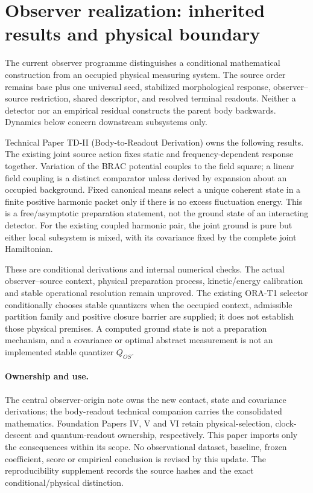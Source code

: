 \documentclass[11pt]{article}
\begin{document}
\section{Observer realization: inherited results and physical boundary}
\label{sec:observer-update-20260914}
The current observer programme distinguishes a conditional mathematical
construction from an occupied physical measuring system. The source order
remains base plus one universal seed, stabilized morphological response,
observer--source restriction, shared descriptor, and resolved terminal
readouts. Neither a detector nor an empirical residual constructs the parent
body backwards. Dynamics below concern downstream subsystems only.

Technical Paper TD-II (Body-to-Readout Derivation) owns the following
results. The existing joint source action fixes static and frequency-dependent
response together. Variation of the BRAC potential couples to the field
square; a linear field coupling is a distinct comparator unless derived by
expansion about an occupied background. Fixed canonical means select a unique
coherent state in a finite positive harmonic packet only if there is no excess
fluctuation energy. This is a free/asymptotic preparation statement, not the
ground state of an interacting detector. For the existing coupled harmonic
pair, the joint ground is pure but either local subsystem is mixed, with its
covariance fixed by the complete joint Hamiltonian.

These are conditional derivations and internal numerical checks. The actual
observer--source context, physical preparation process, kinetic/energy
calibration and stable operational resolution remain unproved. The existing
ORA-T1 selector conditionally chooses stable quantizers when the occupied
context, admissible partition family and positive closure barrier are supplied;
it does not establish those physical premises. A computed ground state is not
a preparation mechanism, and a covariance or optimal abstract measurement is
not an implemented stable quantizer $Q_{OS}$.

\paragraph{Ownership and use.}
The central observer-origin note owns the new contact, state and covariance
derivations; the body-readout technical companion carries the consolidated
mathematics. Foundation Papers IV, V and VI retain physical-selection,
clock-descent and quantum-readout ownership, respectively. This paper imports
only the consequences within its scope. No observational dataset, baseline,
frozen coefficient, score or empirical conclusion is revised by this update.
The reproducibility supplement records the source hashes and the exact
conditional/physical distinction.
\end{document}

